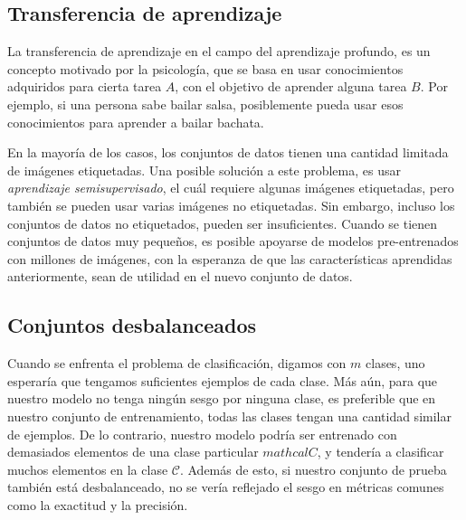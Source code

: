     \subsection{Transferencia de aprendizaje}
    La transferencia de aprendizaje en el campo del aprendizaje profundo, es un concepto motivado por la psicología, que se basa en usar conocimientos adquiridos para cierta tarea $A$, con el objetivo de aprender alguna tarea $B$. Por ejemplo, si una persona sabe bailar salsa, posiblemente pueda usar esos conocimientos para aprender a bailar bachata. 

    En la mayoría de los casos, los conjuntos de datos tienen una cantidad limitada de imágenes etiquetadas. Una posible solución a este problema, es usar \textsl{aprendizaje semisupervisado}, el cuál requiere algunas imágenes etiquetadas, pero también se pueden usar varias imágenes no etiquetadas. Sin embargo, incluso los conjuntos de datos no etiquetados, pueden ser insuficientes. Cuando se tienen conjuntos de datos muy pequeños, es posible apoyarse de modelos pre-entrenados con millones de imágenes, con la esperanza de que las características aprendidas anteriormente, sean de utilidad en el nuevo conjunto de datos.
    \subsection{Conjuntos desbalanceados}
    Cuando se enfrenta el problema de clasificación, digamos con $m$ clases, uno esperaría que tengamos suficientes ejemplos de cada clase. Más aún, para que nuestro modelo no tenga ningún sesgo por ninguna clase, es preferible que en nuestro conjunto de entrenamiento, todas las clases tengan una cantidad similar de ejemplos. De lo contrario, nuestro modelo podría ser entrenado con demasiados elementos de una clase particular $mathcal C$, y tendería a clasificar muchos elementos en la clase $\mathcal C$. Además de esto, si nuestro conjunto de prueba también está desbalanceado, no se vería reflejado el sesgo en métricas comunes como la exactitud y la precisión.

